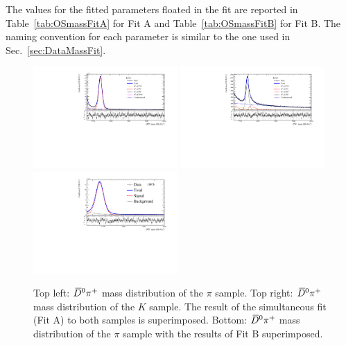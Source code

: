The values for the fitted parameters floated in the fit are reported in Table~\ref{tab:OSmassFitA} for Fit A and Table~\ref{tab:OSmassFitB} for Fit B. The naming convention for each parameter is similar to the one used in Sec.~\ref{sec:DataMassFit}.

\begin{figure}[t]
	\begin{center}
		\includegraphics[width=0.49\textwidth]{AA-Appdx-OSTaggers/figs/MDFit_BeautyMass_Bu2D0Pi_withPulls.pdf}
		\includegraphics[width=0.49\textwidth]{AA-Appdx-OSTaggers/figs/MDFit_BeautyMass_Bu2D0K_withPulls.pdf} \\
		\includegraphics[width=0.49\textwidth]{AA-Appdx-OSTaggers/figs/MDFitForSWeights_BeautyMass_Bu2D0Pi.pdf}
	\end{center}
        \vspace{-2mm}
	\caption{Top left: $\kern 0.2em\overline{\kern -0.2em D}{}^0\pi^+$ mass distribution of the $\pi$ sample. Top right: $\kern 0.2em\overline{\kern -0.2em D}{}^0\pi^+$ mass distribution of the $K$ sample.
	The result of the simultaneous fit (Fit A) to both samples is superimposed.
	Bottom: $\kern 0.2em\overline{\kern -0.2em D}{}^0\pi^+$ mass distribution of the $\pi$ sample with the results of Fit B superimposed.}
	\label{fig:OSmassFit}
\end{figure}

